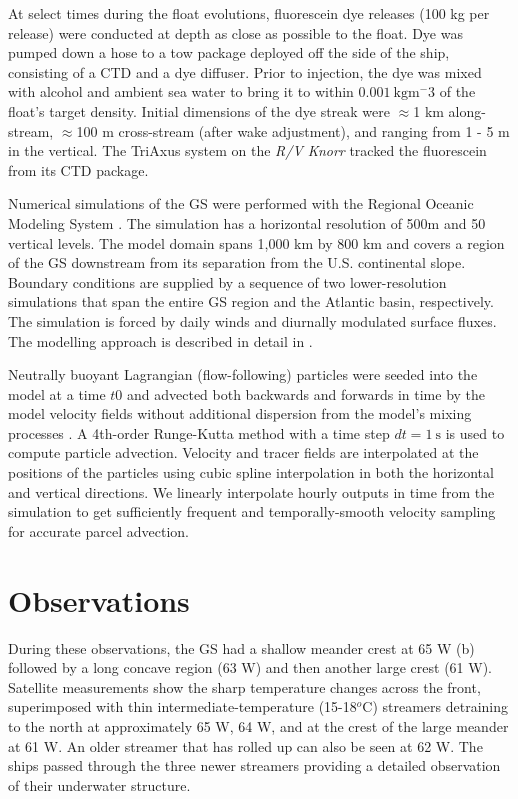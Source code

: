 \documentclass[draft,grl]{agutex2015}
\providecommand{\DIFadd}[1]{{\protect\color{blue}\uwave{#1}}} %
\providecommand{\DIFdel}[1]{{\protect\color{red}\sout{#1}}}                      %
\providecommand{\DIFaddbegin}{} %
\providecommand{\DIFaddend}{} %
\providecommand{\DIFdelbegin}{} %
\providecommand{\DIFdelend}{} %
\begin{document}
\begin{article}
At select times during the float evolutions, fluorescein dye releases (100 kg per release) were conducted at depth as close as possible to the float.  Dye was pumped down a hose to a tow package deployed off the side of the ship, consisting of a CTD and a dye diffuser.  Prior to injection, the dye was mixed with alcohol and ambient sea water to bring it to within \DIFdelbegin \DIFdel{$0.001\ \mathrm{kg m^-3}$ }\DIFdelend \DIFaddbegin \DIFadd{$0.001\ \mathrm{kg m^{-3}}$ }\DIFaddend of the float's target density. Initial dimensions of the dye streak were $\approx$1 km along-stream, $\approx$100 m cross-stream (after wake adjustment), and ranging from 1 - 5 m in the vertical. The TriAxus system on the \emph{R/V Knorr} tracked the fluorescein from its CTD package.  

Numerical simulations of the GS were performed with the Regional Oceanic Modeling System \citep[ROMS][]{shchepetkinmcwilliams05}. The simulation has a horizontal resolution of 500m and 50 vertical levels. The model domain spans 1,000 km by 800 km and covers a region of the GS downstream from its separation from the U.S. continental slope. Boundary conditions are supplied by a sequence of two lower-resolution simulations that span the entire GS region and the Atlantic basin, respectively. The simulation is forced by daily winds and diurnally modulated surface fluxes. The modelling approach is described in detail in \citet{gulaetal15}.

Neutrally buoyant Lagrangian (flow-following) particles were seeded into the model at a time $t0$ and advected both backwards and forwards in time by the model velocity fields without additional dispersion from the model's mixing processes \citep{gulaetal14}. A 4th-order Runge-Kutta method with a time step  $dt = 1\ \mathrm{s}$ is used to compute particle advection. Velocity and tracer fields are interpolated at the positions of the particles using cubic spline interpolation in both the horizontal and vertical directions.  We linearly interpolate hourly outputs in time from the simulation to get sufficiently frequent and temporally-smooth velocity sampling for accurate parcel advection.

\section{Observations}

During these observations, the GS had a shallow meander crest at 65 W (b)  followed by a long concave region (63 W) and then another large  crest (61 W).  Satellite measurements show the sharp temperature changes across the front, superimposed with thin intermediate-temperature (15-18$^o$C) streamers detraining to the north at approximately 65 W, 64 W, and at the crest of the large meander at 61 W.  An older streamer that has rolled up can also be seen at 62 W.  The ships passed through the three newer streamers providing a detailed observation of their underwater structure.  


\end{article}
\end{document}
